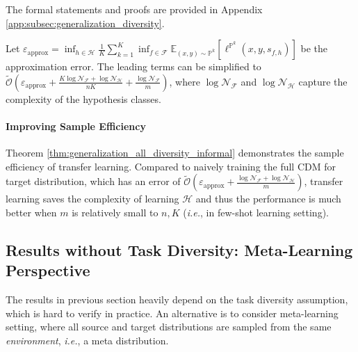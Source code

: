 \documentclass{article}
\numberwithin{equation}{section}
\newcommand{\E}{\mathbb{E}}
\theoremstyle{definition}
\renewcommand{\P}{\mathbb{P}}
\begin{document}
The formal statements and proofs are provided in Appendix \ref{app:subsec:generalization_diversity}.

Let $\varepsilon_{\text{approx}}=\inf_{h\in\mathcal{H}} \frac{1}{K}\sum_{k=1}^K \inf_{f\in\mathcal{F}}\E_{(x,y)\sim\P^k} [\ell^{\P^k} (x,y,s_{f,h})]$ be the approximation error.
The leading terms can be simplified to $\widetilde{\mathcal{O}}\left(\varepsilon_{\text{approx}}+\frac{K\log\mathcal{N}_\mathcal{F}+\log\mathcal{N}_\mathcal{H}}{nK}+\frac{\log\mathcal{N}_\mathcal{F}}{m}\right)$, where $\log\mathcal{N}_\mathcal{F}$ and $\log\mathcal{N}_\mathcal{H}$ capture the complexity of the hypothesis classes.

\paragraph{Improving Sample Efficiency}
Theorem \ref{thm:generalization_all_diversity_informal} demonstrates the sample efficiency of transfer learning. 
Compared to naively training the full CDM for target distribution, which has an error of $\widetilde{\mathcal{O}}\left(\varepsilon_{\text{approx}}+\frac{\log\mathcal{N}_\mathcal{F}+\log\mathcal{N}_\mathcal{H}}{m}\right)$, transfer learning saves the complexity of learning $\mathcal{H}$ and thus the performance is much better when $m$ is relatively small to $n,K$ (\textit{i.e.}, in few-shot learning setting). 

\subsection{Results without Task Diversity: Meta-Learning Perspective}

The results in previous section heavily depend on the task diversity assumption, which is hard to verify in practice.
An alternative is to consider meta-learning setting, where all source and target distributions are sampled from the same \textit{environment}, \textit{i.e.}, a meta distribution.
\end{document}
